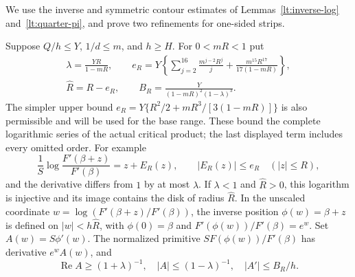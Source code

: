 \documentclass[11pt,reqno]{amsart}
\numberwithin{equation}{section}
\theoremstyle{definition}
\theoremstyle{remark}
\renewcommand{\Re}{\operatorname{Re}}
\begin{document}
We use the inverse and symmetric contour estimates of
Lemmas~\ref{lt:inverse-log} and~\ref{lt:quarter-pi},
and prove two refinements for one-sided strips.

Suppose $Q/h\le Y$, $1/d\le m$, and $h\ge H$.  For $0<mR<1$ put
\begin{equation}\label{or:inverse-parameters}
 \begin{gathered}
 \lambda=\frac{YR}{1-mR},\qquad
 e_R=Y\left\{\sum_{j=2}^{16}\frac{m^{j-2}R^j}{j}
                  +\frac{m^{15}R^{17}}{17(1-mR)}\right\},\\
 \widehat R=R-e_R,\qquad
 B_R=\frac{Y}{(1-mR)^2(1-\lambda)^3}.
 \end{gathered}
\end{equation}
The simpler upper bound
$e_R=Y\{R^2/2+mR^3/[3(1-mR)]\}$ is also permissible and will be
used for the base range.  These bound the complete logarithmic series
of the actual critical product; the last displayed term includes
every omitted order.  For example
\[
 \frac1S\log\frac{F'(\beta+z)}{F'(\beta)}=z+E_R(z),\qquad
 |E_R(z)|\le e_R\quad(|z|\le R),
\]
and the derivative differs from $1$ by at most $\lambda$.
If $\lambda<1$ and $\widehat R>0$, this logarithm is injective and
its image contains the disk of radius $\widehat R$.
In the unscaled coordinate
$w=\log(F'(\beta+z)/F'(\beta))$, the inverse position
$\phi(w)=\beta+z$ is defined on $|w|<h\widehat R$, with
$\phi(0)=\beta$ and $F'(\phi(w))/F'(\beta)=e^w$.
Set $A(w)=S\phi'(w)$.  The normalized primitive
$SF(\phi(w))/F'(\beta)$ has derivative $e^w A(w)$, and
\[
        \Re A\ge(1+\lambda)^{-1},\quad
        |A|\le(1-\lambda)^{-1},\quad |A'|\le B_R/h.
\]
\end{document}

